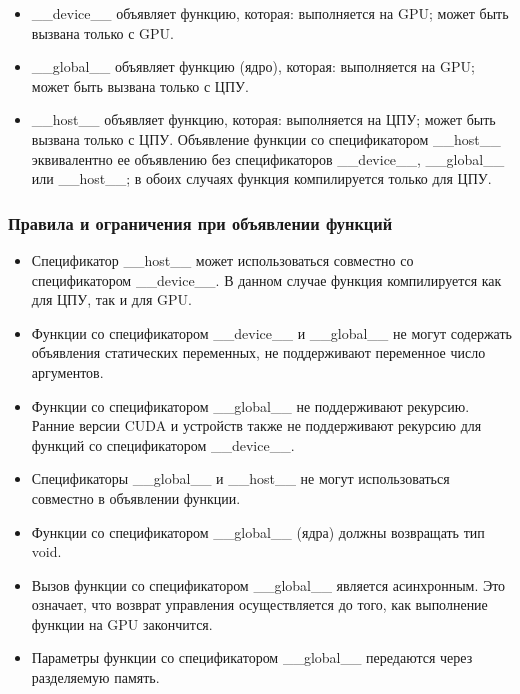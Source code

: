 \documentclass[a4paper, final]{article}
\begin{document}
\begin{itemize}
    \item  \_\_device\_\_ объявляет функцию, которая: выполняется на GPU; может быть вызвана только с GPU.
    \item \_\_global\_\_ объявляет функцию (ядро), которая: выполняется на GPU; может быть вызвана только с ЦПУ.
    \item \_\_host\_\_ объявляет функцию, которая: выполняется на ЦПУ; может быть вызвана только с ЦПУ. Объявление функции со спецификатором \_\_host\_\_ эквивалентно ее объявлению без спецификаторов \_\_device\_\_, \_\_global\_\_ или \_\_host\_\_; в обоих случаях функция компилируется только для ЦПУ.
\end{itemize}

\subsubsection{Правила и ограничения при объявлении функций}
\begin{itemize}
    \item Спецификатор \_\_host\_\_ может использоваться совместно со 
    спецификатором \_\_device\_\_. В данном случае функция компилируется как для ЦПУ, так и для GPU. 
    \item Функции со спецификатором \_\_device\_\_ и \_\_global\_\_ не могут содержать объявления статических переменных, не поддерживают переменное число аргументов. 
    \item Функции со спецификатором \_\_global\_\_ не поддерживают рекурсию. Ранние версии CUDA и устройств также не поддерживают рекурсию для функций со спецификатором \_\_device\_\_. 
    \item Спецификаторы \_\_global\_\_ и \_\_host\_\_ не могут использоваться совместно в объявлении функции.  
    \item Функции со спецификатором \_\_global\_\_ (ядра) должны возвращать тип void.   
    \item Вызов функции со спецификатором \_\_global\_\_ является асинхронным. Это означает, что возврат управления осуществляется до того, как выполнение функции на GPU закончится. 
    \item Параметры функции со спецификатором \_\_global\_\_ передаются через разделяемую память.
\end{itemize}
\end{document}

